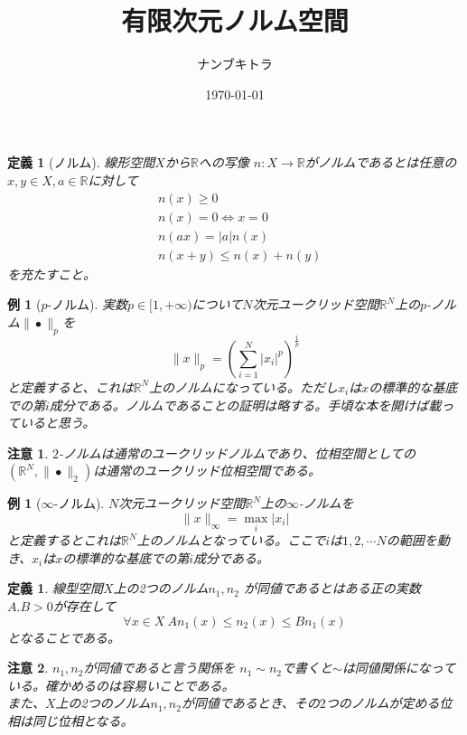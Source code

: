 \documentclass[leqno]{jsarticle}
\title{有限次元ノルム空間}
\author{ナンブキトラ}
\date{\today}
\newtheorem{df}[thm]{定義}
\newtheorem{exam}[thm]{例}
\newtheorem*{cau}{注意}
\newcommand{\rr}{\mathbb{R}}
\newcommand{\mgn}{\infty}
\newcommand{\prn}[1]{\|#1\|_p}
\newcommand{\trn}[1]{\|#1\|_2}
\newcommand{\mrn}[1]{\|#1\|_{\mgn}}
\newcommand{\nor}{n}
\begin{document}
\maketitle

\begin{df}[ノルム]
線形空間$X$から$\rr$への写像
$\nor:X\to \rr$がノルムであるとは任意の$x,y \in X,a\in \rr$に対して
\begin{eqnarray}
&\nor(x)\ge0\\ 
&\nor(x)=0\iff x=0\\ 
&\nor(ax)=|a|n(x)\\ 
&\nor(x+y)\le \nor(x)+\nor(y)
\end{eqnarray}
を充たすこと。
\end{df}


\begin{exam}[$p$-ノルム]実数$p\in [1,+\mgn)$について$N$次元ユークリッド空間$\rr^N$上の$p$-ノルム$\|\bullet\|_p$を
\[
\prn{x}=\left(\sum_{i=1}^N|x_{i}|^p\right)^{\frac{1}{p}}
\]
と定義すると、これは$\rr^N$上のノルムになっている。ただし$x_i$は$x$の標準的な基底での第$i$成分である。ノルムであることの証明は略する。手頃な本を開けば載っていると思う。
\end{exam}
\begin{cau}
$2$-ノルムは通常のユークリッドノルムであり、位相空間としての$(\rr^N,\trn{\bullet})$は通常のユークリッド位相空間である。
\end{cau}

\begin{exam}[$\mgn$-ノルム]$N$次元ユークリッド空間$\rr^N$上の$\mgn$-ノルムを
\[
\mrn{x}=\max_{i}|x_i|
\]
と定義するとこれは$\rr^N$上のノルムとなっている。ここで$i$は$1,2,\cdots N$の範囲を動き、$x_i$は$x$の標準的な基底での第$i$成分である。

\end{exam}

\begin{df}線型空間$X$上の2つのノルム$\nor_{1},\nor_{2}$
が同値であるとはある正の実数$A.B>0$が存在して
\[
\forall x\in X\ A\nor_{1}(x)\le \nor_{2}(x)\le B\nor_{1}(x)
\]
となることである。
\end{df}
\begin{cau}
$\nor_{1},\nor_{2}$が同値であると言う関係を
$\nor_{1}\sim \nor_{2}$で書くと$\sim$は同値関係になっている。確かめるのは容易いことである。\\ 
また、$X$上の2つのノルム$\nor_{1},\nor_{2}$が同値であるとき、その$2$つのノルムが定める位相は同じ位相となる。
\end{cau}
\end{document}
